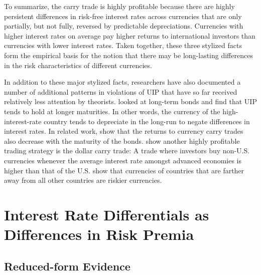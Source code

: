 \documentclass{ar-1col}
\begin{document}
To summarize, the carry trade is highly profitable because there are highly persistent differences in risk-free interest rates across currencies that are only partially, but not fully, reversed by predictable depreciations. Currencies with higher interest rates on average pay higher returns to international investors than currencies with lower interest rates. Taken together, these three stylized facts form the empirical basis for the notion that there may be long-lasting differences in the risk characteristics of different currencies.

In addition to these major stylized facts, researchers have also documented a number of additional patterns in violations of UIP that have so far received relatively less attention by theorists. \citet{ChinnMeredith2004} looked at long-term bonds and find that UIP tends to hold at longer maturities. In other words, the currency of the high-interest-rate country tends to depreciate in the long-run to negate differences in interest rates. In related work, \citet{LustigStathopoulosVerdelhan2019} show that the returns to currency carry trades also decrease with the maturity of the bonds. \citet{LRV2014} show another highly profitable trading strategy is the dollar carry trade: A trade where investors buy non-U.S. currencies whenever the average interest rate amongst advanced economies is higher than that of the U.S. \citet{LustigRichmond2020} show that currencies of countries that are farther away from all other countries are riskier currencies.



\section{Interest Rate Differentials as Differences in Risk Premia \label{sec_RP}}

\subsection{Reduced-form Evidence}
\end{document}
